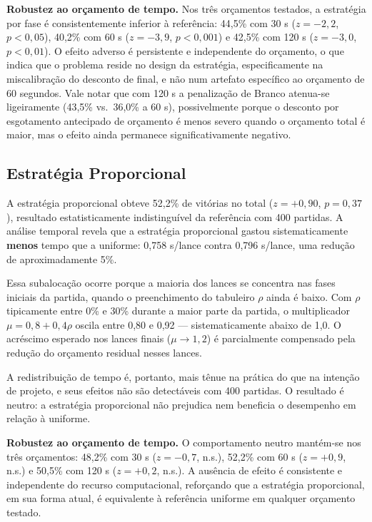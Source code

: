 \documentclass[cic,tc]{iiufrgs}
\begin{document}
\textbf{Robustez ao orçamento de tempo.} Nos três orçamentos testados, a estratégia por fase é consistentemente inferior à referência: 44,5\% com 30 s ($z = -2{,}2$, $p < 0{,}05$), 40,2\% com 60 s ($z = -3{,}9$, $p < 0{,}001$) e 42,5\% com 120 s ($z = -3{,}0$, $p < 0{,}01$). O efeito adverso é persistente e independente do orçamento, o que indica que o problema reside no design da estratégia, especificamente na miscalibração do desconto de final, e não num artefato específico ao orçamento de 60 segundos. Vale notar que com 120 s a penalização de Branco atenua-se ligeiramente (43,5\% vs.\ 36,0\% a 60 s), possivelmente porque o desconto por esgotamento antecipado de orçamento é menos severo quando o orçamento total é maior, mas o efeito ainda permanece significativamente negativo.

\subsection{Estratégia Proporcional}
\label{sec:results_proportional}

A estratégia proporcional obteve 52,2\% de vitórias no total ($z = +0{,}90$, $p = 0{,}37$), resultado estatisticamente indistinguível da referência com 400 partidas. A análise temporal revela que a estratégia proporcional gastou sistematicamente \textbf{menos} tempo que a uniforme: 0,758 s/lance contra 0,796 s/lance, uma redução de aproximadamente 5\%.

Essa subalocação ocorre porque a maioria dos lances se concentra nas fases iniciais da partida, quando o preenchimento do tabuleiro $\rho$ ainda é baixo. Com $\rho$ tipicamente entre 0\% e 30\% durante a maior parte da partida, o multiplicador $\mu = 0{,}8 + 0{,}4\rho$ oscila entre 0,80 e 0,92 — sistematicamente abaixo de 1,0. O acréscimo esperado nos lances finais ($\mu \to 1{,}2$) é parcialmente compensado pela redução do orçamento residual nesses lances.

A redistribuição de tempo é, portanto, mais tênue na prática do que na intenção de projeto, e seus efeitos não são detectáveis com 400 partidas. O resultado é neutro: a estratégia proporcional não prejudica nem beneficia o desempenho em relação à uniforme.

\textbf{Robustez ao orçamento de tempo.} O comportamento neutro mantém-se nos três orçamentos: 48,2\% com 30 s ($z = -0{,}7$, n.s.), 52,2\% com 60 s ($z = +0{,}9$, n.s.) e 50,5\% com 120 s ($z = +0{,}2$, n.s.). A ausência de efeito é consistente e independente do recurso computacional, reforçando que a estratégia proporcional, em sua forma atual, é equivalente à referência uniforme em qualquer orçamento testado.
\end{document}
